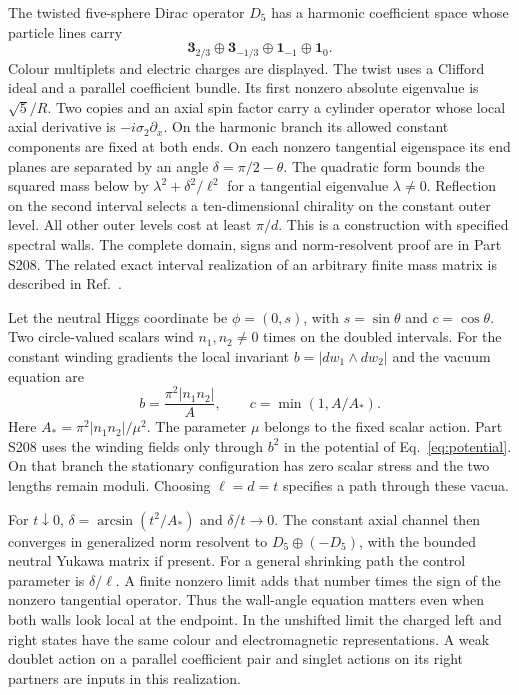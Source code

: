\documentclass[aps,prd,reprint,onecolumn,nofootinbib,amsmath,amssymb]{revtex4-2}
\begin{document}
The twisted five-sphere Dirac operator $D_5$ has a harmonic coefficient space whose particle lines carry
\begin{equation}
 \mathbf{3}_{2/3}\oplus\mathbf{3}_{-1/3}\oplus\mathbf{1}_{-1}\oplus\mathbf{1}_{0}.
\end{equation}
Colour multiplets and electric charges are displayed. The twist uses a Clifford ideal and a parallel coefficient bundle. Its first nonzero absolute eigenvalue is $\sqrt5/R$. Two copies and an axial spin factor carry a cylinder operator whose local axial derivative is $-i\sigma_2\partial_x$. On the harmonic branch its allowed constant components are fixed at both ends. On each nonzero tangential eigenspace its end planes are separated by an angle $\delta=\pi/2-\theta$. The quadratic form bounds the squared mass below by $\lambda^2+\delta^2/\ell^2$ for a tangential eigenvalue $\lambda\ne0$. Reflection on the second interval selects a ten-dimensional chirality on the constant outer level. All other outer levels cost at least $\pi/d$. This is a construction with specified spectral walls. The complete domain, signs and norm-resolvent proof are in Part S208. The related exact interval realization of an arbitrary finite mass matrix is described in Ref.~\cite{boundarynote}.

Let the neutral Higgs coordinate be $\phi=(0,s)$, with $s=\sin\theta$ and $c=\cos\theta$. Two circle-valued scalars wind $n_1,n_2\ne0$ times on the doubled intervals. For the constant winding gradients the local invariant $b=|dw_1\wedge dw_2|$ and the vacuum equation are
\begin{equation}
 b=\frac{\pi^2|n_1n_2|}{A},\qquad c=\min(1,A/A_*).
 \label{eq:area}
\end{equation}
Here $A_*=\pi^2|n_1n_2|/\mu^2$. The parameter $\mu$ belongs to the fixed scalar action. Part S208 uses the winding fields only through $b^2$ in the potential of Eq.~\eqref{eq:potential}. On that branch the stationary configuration has zero scalar stress and the two lengths remain moduli. Choosing $\ell=d=t$ specifies a path through these vacua.

For $t\downarrow0$, $\delta=\arcsin(t^2/A_*)$ and $\delta/t\to0$. The constant axial channel then converges in generalized norm resolvent to $D_5\oplus(-D_5)$, with the bounded neutral Yukawa matrix if present. For a general shrinking path the control parameter is $\delta/\ell$. A finite nonzero limit adds that number times the sign of the nonzero tangential operator. Thus the wall-angle equation matters even when both walls look local at the endpoint. In the unshifted limit the charged left and right states have the same colour and electromagnetic representations. A weak doublet action on a parallel coefficient pair and singlet actions on its right partners are inputs in this realization.
\end{document}

